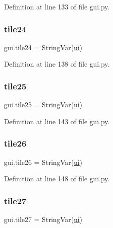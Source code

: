 Definition at line 133 of file gui.\+py.

\mbox{\label{namespacegui_a5f2cfe715c136f8cae1ea50bd8081a50}} 
\subsubsection{\texorpdfstring{tile24}{tile24}}
{\footnotesize\ttfamily gui.\+tile24 = String\+Var(\mbox{\hyperlink{namespacegui_a40ab7281456eadbea2dc2038f5c24fa1}{ui}})}



Definition at line 138 of file gui.\+py.

\mbox{\label{namespacegui_ada98a88ba76a04678da5fdeaca867b97}} 
\subsubsection{\texorpdfstring{tile25}{tile25}}
{\footnotesize\ttfamily gui.\+tile25 = String\+Var(\mbox{\hyperlink{namespacegui_a40ab7281456eadbea2dc2038f5c24fa1}{ui}})}



Definition at line 143 of file gui.\+py.

\mbox{\label{namespacegui_a6f5755e2ff302976b2d5a7a6973255ce}} 
\subsubsection{\texorpdfstring{tile26}{tile26}}
{\footnotesize\ttfamily gui.\+tile26 = String\+Var(\mbox{\hyperlink{namespacegui_a40ab7281456eadbea2dc2038f5c24fa1}{ui}})}



Definition at line 148 of file gui.\+py.

\mbox{\label{namespacegui_a766749c4e7c91af5ead73f0964a5f8d6}} 
\subsubsection{\texorpdfstring{tile27}{tile27}}
{\footnotesize\ttfamily gui.\+tile27 = String\+Var(\mbox{\hyperlink{namespacegui_a40ab7281456eadbea2dc2038f5c24fa1}{ui}})}



